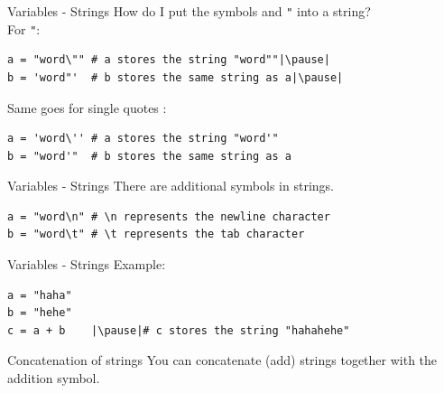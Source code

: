 \documentclass[dvipsnames, svgnames, x11names]{beamer}
\begin{document}
\begin{frame}[fragile]{Variables - Strings}
How do I put the symbols \texttt{\textquotesingle} and \texttt{"} into a string?\pause\\
For \texttt{"}:\pause
	
\begin{verbatim}
a = "word\"" # a stores the string "word""|\pause|
b = 'word"'  # b stores the same string as a|\pause|
\end{verbatim}
\vspace{1em}
Same goes for single quotes \texttt{\textquotesingle}:
\begin{verbatim}
a = 'word\'' # a stores the string "word'"
b = "word'"  # b stores the same string as a
\end{verbatim}
\end{frame}

\begin{frame}[fragile]{Variables - Strings}
There are additional symbols in strings.
\begin{verbatim}
a = "word\n" # \n represents the newline character
b = "word\t" # \t represents the tab character
\end{verbatim}
\end{frame}

\begin{frame}[fragile]{Variables - Strings}
Example:
\begin{verbatim}
a = "haha"
b = "hehe"
c = a + b    |\pause|# c stores the string "hahahehe"
\end{verbatim}
\pause
\begin{block}{Concatenation of strings}
You can concatenate (add) strings together with the addition symbol.
\end{block}
\end{frame}
\end{document}
